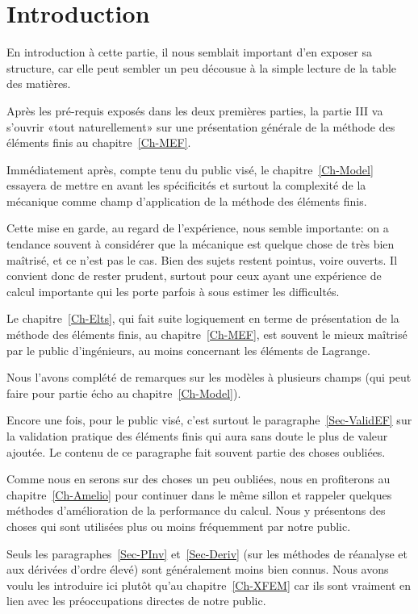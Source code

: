 \chapter*{Introduction}
En introduction à cette partie, il nous semblait important d'en exposer sa structure, car elle peut sembler un peu décousue à la simple lecture de la table des matières.

\medskip
Après les pré-requis exposés dans les deux premières parties, la partie III va s'ouvrir «tout naturellement» sur une présentation générale de la méthode des éléments finis au chapitre~\ref{Ch-MEF}.

\medskip
Immédiatement après, compte tenu du public visé, le chapitre~\ref{Ch-Model} essayera de mettre en avant les spécificités et surtout la complexité de la mécanique comme champ d'application de la méthode des éléments finis.

Cette mise en garde, au regard de l'expérience, nous semble importante: on a tendance souvent à considérer que la mécanique est quelque chose de très bien maîtrisé, et ce n'est pas le cas. Bien des sujets restent pointus, voire ouverts. Il convient donc de rester prudent, surtout pour ceux ayant une expérience de calcul importante qui les porte parfois à sous estimer les difficultés.

\medskip
Le chapitre~\ref{Ch-Elts}, qui fait suite logiquement en terme de présentation de la méthode des éléments finis, au chapitre~\ref{Ch-MEF}, est souvent le mieux maîtrisé par le public d'ingénieurs, au moins concernant les éléments de Lagrange.

Nous l'avons complété de remarques sur les modèles à plusieurs champs (qui peut faire pour partie écho au chapitre~\ref{Ch-Model}).

Encore une fois, pour le public visé, c'est surtout le paragraphe~\ref{Sec-ValidEF} sur la validation pratique des éléments finis qui aura sans doute le plus de valeur ajoutée. Le contenu de ce paragraphe fait souvent partie des choses oubliées.

\medskip
Comme nous en serons sur des choses un peu oubliées, nous en profiterons au chapitre~\ref{Ch-Amelio} pour continuer dans le même sillon et rappeler quelques méthodes d'amélioration de la performance du calcul. Nous y présentons des choses qui sont utilisées plus ou moins fréquemment par notre public.

Seuls les paragraphes~\ref{Sec-PInv} et~\ref{Sec-Deriv} (sur les méthodes de réanalyse et aux dérivées d'ordre élevé) sont généralement moins bien connus. Nous avons voulu les introduire ici plutôt qu'au chapitre~\ref{Ch-XFEM} car ils sont vraiment en lien avec les préoccupations directes de notre public.

